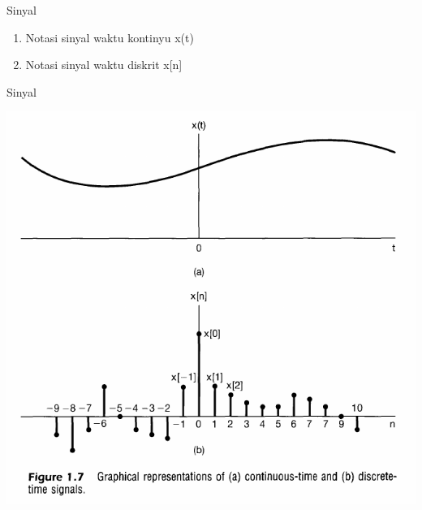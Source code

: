 \documentclass[pdflatex,compress,mathserif]{beamer}
\begin{document}
\begin{frame}{Sinyal}
	\begin{enumerate}
		\item Notasi sinyal waktu kontinyu x(t)
		\item Notasi sinyal waktu diskrit x[n]
	\end{enumerate}
\end{frame}

\begin{frame}{Sinyal}
	\begin{center}
		\includegraphics[width=0.7\linewidth]{img/img07}
	\end{center}
\end{frame}
\end{document}
